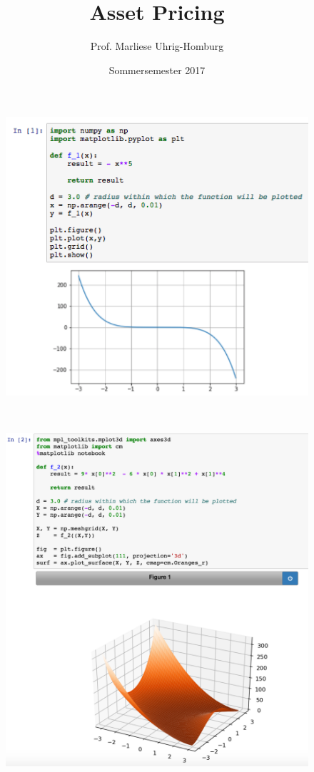 \documentclass[12pt]{extreport} %
\title{Asset Pricing}
\author{Prof. Marliese Uhrig-Homburg}
\date{Sommersemester 2017}
\theoremstyle{named}
\theoremstyle{nnamed}
\theoremstyle{itshape}
\theoremstyle{normal}
\begin{document}
\thispagestyle{empty}

\thispagestyle{firststyle}
\begin{figure}[h!]
  \centering
  \includegraphics[scale=0.55]{img/sui-i}
  \label{fig:sub1}
\end{figure} ~\smallskip

\begin{figure}[h!]
  \centering
  \includegraphics[scale=0.41]{img/sui-ii}
  \label{fig:sub2}
\end{figure}
\end{document}
